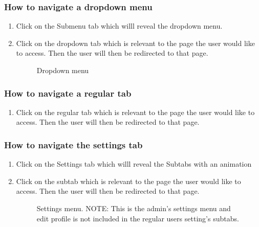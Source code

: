 \documentclass[14pt, a4paper]{article}
\begin{document}
	\subsubsection{How to navigate a dropdown menu}
		\begin{enumerate}
			\item Click on the Submenu tab which willl reveal the dropdown menu.
			\item Click on the dropdown tab which is relevant to the page the user would like to access. Then the user will then be redirected to that page.
			\begin{figure}[H]
				\centerline{}
				\caption{Dropdown menu}
  				\label{fig:navbar5}
			\end{figure}
		\end{enumerate}
	\subsubsection{How to navigate a regular tab}
		\begin{enumerate}
			\item Click on the regular tab which is relevant to the page the user would like to access. Then the user will then be redirected to that page.
		\end{enumerate}
	\subsubsection{How to navigate the settings tab}
		\begin{enumerate}
			\item Click on the Settings tab which willl reveal the Subtabs with an animation
			\item Click on the subtab which is relevant to the page the user would like to access. Then the user will then be redirected to that page.
			\begin{figure}[H]
				\centerline{}
				\caption{Settings menu. NOTE: This is the admin's settings menu and edit profile is not included in the regular users setting's subtabs.}
  				\label{fig:navbar6}
			\end{figure}
		\end{enumerate}
\end{document}
